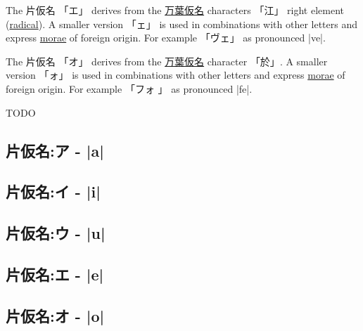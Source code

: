 \documentclass[paper=a4,headings=small,titlepage,makeidx,fontsize=12pt]{scrbook}
\begin{document}
The 片仮名 {「エ」} derives from the
\hyperref[sec:Manyogana]{万葉仮名} characters {「江」} right element
(\hyperref[sec:Radical]{radical}). A smaller version {「ェ」} is used in
combinations with other letters and express \hyperref[sec:Mora]{morae} of
foreign origin. For example {「ヴェ」} as pronounced |ve|.

The 片仮名 {「オ」} derives from the
\hyperref[sec:Manyogana]{万葉仮名} character {「於」}. A smaller version
{「ォ」} is used in combinations with other letters and express
\hyperref[sec:Mora]{morae} of foreign origin. For example {「フォ 」} as
pronounced |fe|.

\newpage
TODO
\newpage


\subsection{片仮名:ア - |a|} \label{sec:KatakanaA}



\subsection{片仮名:イ - |i|} \label{sec:KatakanaI}

 

\subsection{片仮名:ウ - |u|} \label{sec:KatakanaU}

 

\subsection{片仮名:エ - |e|} \label{sec:KatakanaE}

 

\subsection{片仮名:オ - |o|} \label{sec:KatakanaO}
\end{document}
